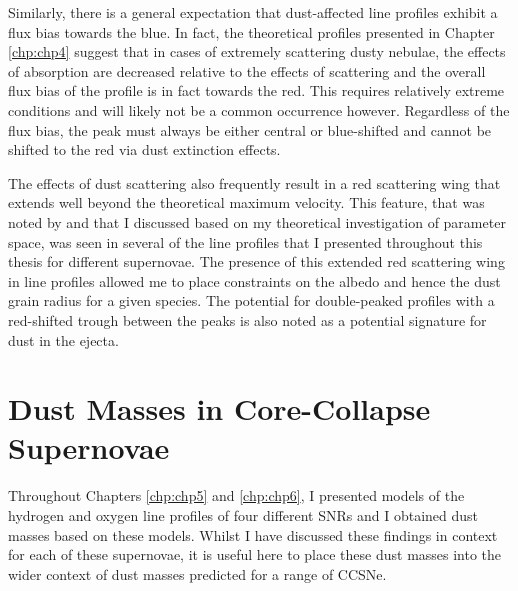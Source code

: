 Similarly, there is a general expectation that dust-affected line profiles exhibit a flux bias towards the blue.  In fact, the theoretical profiles presented in Chapter \ref{chp:chp4} suggest that in cases of extremely scattering dusty nebulae, the effects of absorption are decreased relative to the effects of scattering and the overall flux bias of the profile is in fact towards the red.  This requires relatively extreme conditions and will likely not be a common occurrence however.   Regardless of the flux bias, the peak must always be either central or blue-shifted and cannot be shifted to the red via dust extinction effects.  

The effects of dust scattering also frequently result in a red scattering wing that extends well beyond the theoretical maximum velocity.  This feature, that was noted by \citet{Lucy1989} and that I discussed based on my theoretical investigation of parameter space, was seen in several of the line profiles that I presented throughout this thesis for different supernovae.  The presence of this extended red scattering wing in line profiles allowed me to place constraints on the albedo and hence the dust grain radius for a given species.  The potential for double-peaked profiles with a red-shifted trough between the peaks is also noted as a potential signature for dust in the ejecta.

\section{Dust Masses in Core-Collapse Supernovae}

Throughout Chapters \ref{chp:chp5} and \ref{chp:chp6}, I presented models of the hydrogen and oxygen line profiles of four different SNRs and I obtained dust masses based on these models.  Whilst I have discussed these findings in context for each of these supernovae, it is useful here to place these dust masses into the wider context of dust masses predicted for a range of CCSNe.  

